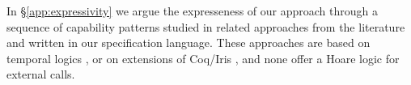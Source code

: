 \newcommand{\paragraphSDD}[1]{\vspace{.02cm}{\textit{#1}}}
 
In  \S \ref{app:expressivity} we argue the expresseness of our approach  through a sequence of capability patterns studied in related approaches from the literature  
 \cite{OOPSLA22,dd,VerX,irisWasm23,ddd} and written in our specification language.
These approaches %
 are based on temporal logics \cite{VerX,OOPSLA22}, or on extensions of Coq/Iris \cite{dd,irisWasm23,ddd}, and
none offer a Hoare logic    for external calls.

 

